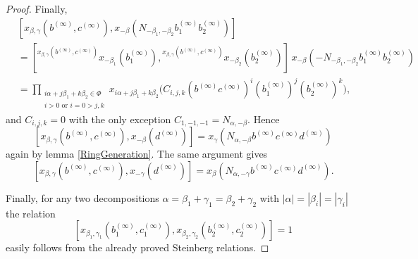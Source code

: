 \documentclass{article}
\numberwithin{equation}{section}
\theoremstyle{definition}
\theoremstyle{remark}
\newcommand{\up}[2]{{^{#1}\!{#2}}}
\begin{document}
\begin{proof}
 Finally,
 \begin{align*}
  &[x_{\beta, \gamma}(b^{(\infty)}, c^{(\infty)}),
  x_{-\beta}(N_{-\beta_1, -\beta_2} b_1^{(\infty)} b_2^{(\infty)})]\\
  &= [\up{x_{\beta, \gamma}(b^{(\infty)}, c^{(\infty)})}
   {x_{-\beta_1}(b_1^{(\infty)})},
  \up{x_{\beta, \gamma}(b^{(\infty)}, c^{(\infty)})}
   {x_{-\beta_2}(b_2^{(\infty)})}]\,
  x_{-\beta}(-N_{-\beta_1, -\beta_2} b_1^{(\infty)} b_2^{(\infty)})\\
  &= \prod_{\substack{i\alpha + j\beta_1 + k\beta_2 \in \Phi\\ i > 0 \text{ or } i = 0 > j, k}}
  x_{i\alpha + j\beta_1 + k\beta_2}\bigl(C_{i, j, k} (b^{(\infty)} c^{(\infty)})^i (b_1^{(\infty)})^j (b_2^{(\infty)})^k\bigr),
 \end{align*}
 and \(C_{i, j, k} = 0\) with the only exception \(C_{1, -1, -1} = N_{\alpha, -\beta}\). Hence
 \[[x_{\beta, \gamma}(b^{(\infty)}, c^{(\infty)}), x_{-\beta}(d^{(\infty)})] = x_\gamma(N_{\alpha, -\beta} b^{(\infty)} c^{(\infty)} d^{(\infty)})\]
 again by lemma \ref{RingGeneration}. The same argument gives
 \[[x_{\beta, \gamma}(b^{(\infty)}, c^{(\infty)}), x_{-\gamma}(d^{(\infty)})] = x_\beta(N_{\alpha, -\gamma} b^{(\infty)} c^{(\infty)} d^{(\infty)}).\]

 Finally, for any two decompositions \(\alpha = \beta_1 + \gamma_1 = \beta_2 + \gamma_2\) with \(|\alpha| = |\beta_i| = |\gamma_i|\) the relation
 \[[x_{\beta_1, \gamma_1}(b_1^{(\infty)}, c_1^{(\infty)}),
 x_{\beta_2, \gamma_2}(b_2^{(\infty)}, c_2^{(\infty)})] = 1\]
 easily follows from the already proved Steinberg relations.
\end{proof}
\end{document}
